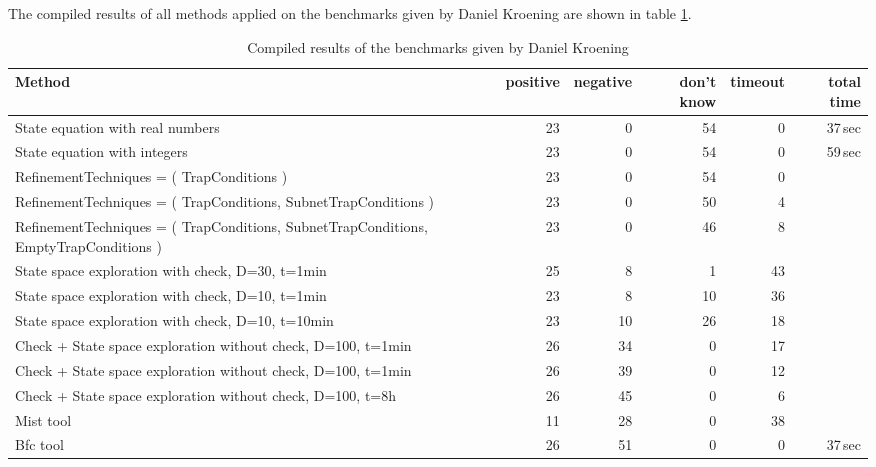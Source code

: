 \documentclass{article}
\begin{document}
The compiled results of all methods applied on the benchmarks given by Daniel Kroening are shown in table \ref{table-results-compiled-dk}.
\begin{table}[h]
\begin{center}
  \begin{tabular}{ | p{5cm} | r | r | r | r | r | }
    \hline
    Method & positive & negative & don't know & timeout & total time \\
    \hline
    State equation with real numbers & 23 &  0 & 54 &  0 & 37\,sec\\
    State equation with integers     & 23 &  0 & 54 &  0 & 59\,sec \\
    \hline
    RefinementTechniques = ( TrapConditions ) & 23 &  0 & 54 &  0 & \\
    RefinementTechniques = ( TrapConditions, SubnetTrapConditions ) &
    23 &  0 & 50 &  4 & \\
    RefinementTechniques = ( TrapConditions, SubnetTrapConditions, EmptyTrapConditions ) &
    23 &  0 & 46 &  8 & \\
    \hline
    State space exploration with check, D=30, t=1min  & 25 &  8 &  1 &  43 & \\
    State space exploration with check, D=10, t=1min  & 23 &  8 & 10 &  36 & \\
    State space exploration with check, D=10, t=10min & 23 & 10 & 26 &  18 & \\
    \hline
    Check + State space exploration without check, D=100, t=1min & 26 & 34 & 0 & 17 & \\
    Check + State space exploration without check, D=100, t=1min & 26 & 39 & 0 & 12 & \\
    Check + State space exploration without check, D=100, t=8h & 26 & 45 & 0 & 6 & \\
    \hline
    Mist tool & 11 & 28 & 0 & 38 & \\
    Bfc tool  & 26 & 51 & 0 &  0 & 37\,sec\\
    \hline
  \end{tabular}
\end{center}
\caption{Compiled results of the benchmarks given by Daniel Kroening}
\label{table-results-compiled-dk}
\end{table}
\end{document}
